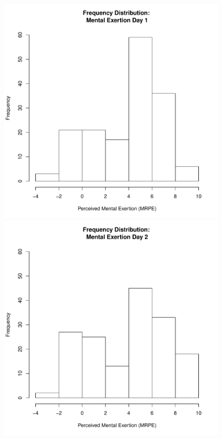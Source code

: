 \documentclass[12pt]{report}
\begin{document}
{\begin{figure}[htbp]
  \includegraphics[scale =.4]{../images/distMentalDay1.pdf}
  \includegraphics[scale =.4]{../images/distMentalDay2.pdf}

\end{figure}}
\end{document}
